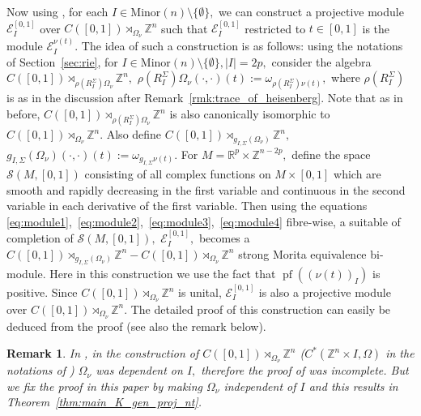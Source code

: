 \documentclass[9pt, BCOR=2mm]{amsart}
\numberwithin{equation}{section}
\numberwithin{equation}{section}
\newtheorem{remark}[theorem]{Remark}
\newcommand{\Z}{{\mathbb{Z}}}
\newcommand{\R}{{\mathbb{R}}}
\newcommand{\pf}{{\operatorname{pf}}}
\begin{document}
  Now using \cite[Theorem 3.3]{Cha20}, for each $I\in \mathrm{Minor}(n)\setminus\{\emptyset\},$ we can construct a projective module $\mathcal{E}_{I}^{[0,1]}$ over $C([0,1])\rtimes_{\Omega_{\nu}} \Z^n$ such that $\mathcal{E}_{I}^{[0,1]}$ restricted to  $t\in [0,1]$ is the module $\mathcal{E}_{I}^{{\nu}(t)}.$ The idea of such a construction is as follows: using the notations of Section~\ref{sec:rie}, for $I\in \mathrm{Minor}(n)\setminus\{\emptyset\}, |I|=2p,$ consider the algebra $C([0,1])\rtimes_{\rho(R^{\Sigma}_I)\Omega_{\nu}} \Z^n,$ $\rho(R^{\Sigma}_I)\Omega_{\nu}(\cdot ,\cdot)(t):=\omega_{\rho(R^{\Sigma}_I){\nu}(t)},$ where $\rho(R^{\Sigma}_I)$ is as in the discussion after Remark~\ref{rmk:trace_of_heisenberg}. Note that as in before, $C([0,1])\rtimes_{\rho(R^{\Sigma}_I)\Omega_{\nu}} \Z^n$ is also canonically isomorphic to $C([0,1])\rtimes_{\Omega_{\nu}} \Z^n.$ Also define  $C([0,1])\rtimes_{g_{I,\Sigma}(\Omega_{\nu})} \Z^n,$ $g_{I,\Sigma}(\Omega_{\nu})(\cdot,\cdot)(t):=\omega_{g_{I,\Sigma}{\nu}(t)}.$ For $M= \R^p \times \Z^{n-2p},$ define the space $\mathscr{S}(M, [0,1])$ consisting of all complex functions on $M \times [0,1]$ which are smooth and rapidly decreasing in the first  variable and continuous in the second variable in each derivative of the first variable. Then using the equations \ref{eq:module1},~\ref{eq:module2},~\ref{eq:module3},~\ref{eq:module4} fibre-wise, a suitable of completion of $\mathscr{S}(M, [0,1]),$ $\mathcal{E}_{I}^{[0,1]},$ becomes a $C([0,1])\rtimes_{g_{I,\Sigma}(\Omega_{\nu})} \Z^n-C([0,1])\rtimes_{\Omega_{\nu}} \Z^n$ strong Morita equivalence bi-module. Here in this construction we use the fact that $\pf(({\nu}(t))_I)$ is positive. Since $C([0,1])\rtimes_{\Omega_{\nu}} \Z^n$ is unital, $\mathcal{E}_{I}^{[0,1]}$ is also a projective module over $C([0,1])\rtimes_{\Omega_{\nu}} \Z^n.$ The detailed proof of this construction can easily be deduced from the proof \cite[Theorem 3.3]{Cha20} (see also the remark below).
  
  \begin{remark}
  	In \cite{Cha20}, in the construction of $C([0,1])\rtimes_{\Omega_{\nu}} \Z^n$ ($C^{*}\left(\mathbb{Z}^{n} \times I, \Omega\right)$ in the notations of \cite{Cha20}) $\Omega_{\nu}$ was dependent on $I,$ therefore the proof of \cite[Theorem 4.7]{Cha20} was incomplete. But we fix the proof in this paper by making $\Omega_{\nu}$ independent of $I$ and this results in Theorem~\ref{thm:main_K_gen_proj_nt}.   
   \end{remark}       
   
  
  
\end{document}
